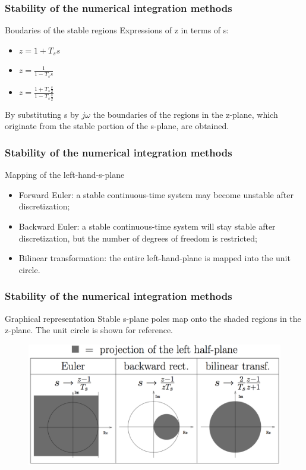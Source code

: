 \begin{frame}
	\frametitle{Stability of the numerical integration methods}
	\begin{block}{Boudaries of the stable regions}
		Expressions of z in terms of s:
		\begin{itemize}
			\item $z = 1 + T_ss$
			\item $z = \frac{1}{1 - T_ss}$
			\item $z = \frac{1 + T_s\frac{s}{2}}{1 - T_s\frac{s}{2}}$
		\end{itemize}
		By substituting s by $j\omega$ the boundaries of the regions in the z-plane, which originate from the stable portion of the s-plane, are obtained.
	\end{block}
\end{frame}

\begin{frame}
	\frametitle{Stability of the numerical integration methods}
	\begin{block}{Mapping of the left-hand-s-plane}
		\begin{itemize}
			\item Forward Euler: a stable continuous-time system may become unstable after discretization;\\
			\item Backward Euler: a stable continuous-time system will stay stable after discretization, but the number of degrees of freedom is restricted;\\
			\item Bilinear transformation: the entire left-hand-plane is mapped into the unit circle.\\
		\end{itemize}
	\end{block}
\end{frame}

\begin{frame}
	\frametitle{Stability of the numerical integration methods}
	\begin{block}{Graphical representation}
		Stable s-plane poles map onto the shaded regions in the z-plane. The unit circle is shown for reference.
	\begin{figure}
		\centering
		\includegraphics[width=0.85\linewidth]{Stabiliteit}
	\end{figure}
	\end{block}
\end{frame}


